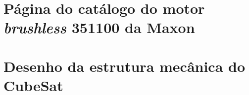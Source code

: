 \documentclass[
	12pt,				%
	openany,			%
	twoside,			%
	a4paper,			%
	english,			%
	french,				%
	spanish,			%
	brazil,				%
	oldfontcommands
	]{abntex2}
\begin{document}
\begin{anexosenv}
\partanexos
\chapter{Página do catálogo do motor \textit{brushless} 351100 da Maxon}



\label{an:MM}

\chapter{Desenho da estrutura mecânica do CubeSat}

\label{an:MS}








\end{anexosenv}
\end{document}
